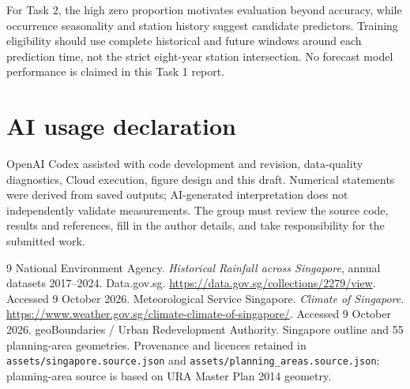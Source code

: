 \documentclass[10pt,a4paper]{article}
\begin{document}
For Task 2, the high zero proportion motivates evaluation beyond accuracy, while occurrence seasonality and station history suggest candidate predictors. Training eligibility should use complete historical and future windows around each prediction time, not the strict eight-year station intersection. No forecast model performance is claimed in this Task 1 report.

\section{AI usage declaration}
OpenAI Codex assisted with code development and revision, data-quality diagnostics, Cloud execution, figure design and this draft. Numerical statements were derived from saved outputs; AI-generated interpretation does not independently validate measurements. The group must review the source code, results and references, fill in the author details, and take responsibility for the submitted work.

\begin{thebibliography}{9}
 National Environment Agency. \emph{Historical Rainfall across Singapore}, annual datasets 2017--2024. Data.gov.sg. \url{https://data.gov.sg/collections/2279/view}. Accessed 9 October 2026.
 Meteorological Service Singapore. \emph{Climate of Singapore}. \url{https://www.weather.gov.sg/climate-climate-of-singapore/}. Accessed 9 October 2026.
 geoBoundaries / Urban Redevelopment Authority. Singapore outline and 55 planning-area geometries. Provenance and licences retained in \texttt{assets/singapore.source.json} and \texttt{assets/planning\_areas.source.json}; planning-area source is based on URA Master Plan 2014 geometry.
\end{thebibliography}
\end{document}
